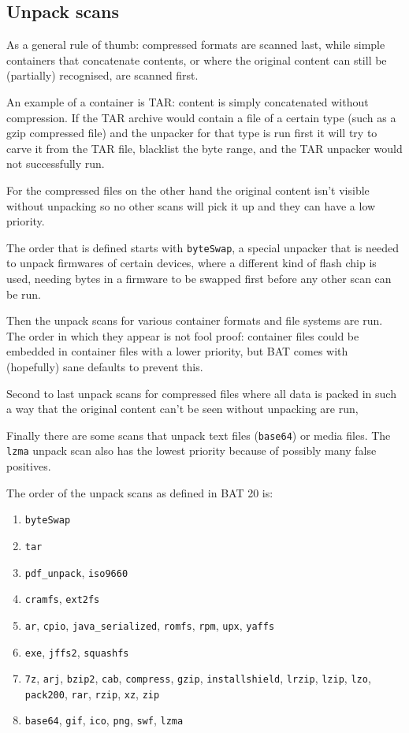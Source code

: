 \documentclass[10pt]{article}
\begin{document}
\subsection{Unpack scans}

As a general rule of thumb: compressed formats are scanned last, while
simple containers that concatenate contents, or where the original content can
still be (partially) recognised, are scanned first.

An example of a container is TAR: content is simply concatenated without
compression. If the TAR archive would contain a file of a certain type (such as
a gzip compressed file) and the unpacker for that type is run first it will try
to carve it from the TAR file, blacklist the byte range, and the TAR unpacker
would not successfully run.

For the compressed files on the other hand the original content isn't visible
without unpacking so no other scans will pick it up and they can have a low
priority.

The order that is defined starts with \texttt{byteSwap}, a special unpacker
that is needed to unpack firmwares of certain devices, where a different kind
of flash chip is used, needing bytes in a firmware to be swapped first before
any other scan can be run.

Then the unpack scans for various container formats and file systems are run.
The order in which they appear is not fool proof: container files could be
embedded in container files with a lower priority, but BAT comes with
(hopefully) sane defaults to prevent this.

Second to last unpack scans for compressed files where all data is packed in
such a way that the original content can't be seen without unpacking are run,

Finally there are some scans that unpack text files (\texttt{base64}) or media
files. The \texttt{lzma} unpack scan also has the lowest priority because of
possibly many false positives.

The order of the unpack scans as defined in BAT 20 is:

\begin{enumerate}
\item \texttt{byteSwap}
\item \texttt{tar}
\item \texttt{pdf\_unpack}, \texttt{iso9660}
\item \texttt{cramfs}, \texttt{ext2fs}
\item \texttt{ar}, \texttt{cpio}, \texttt{java\_serialized}, \texttt{romfs},
\texttt{rpm}, \texttt{upx}, \texttt{yaffs}
\item \texttt{exe}, \texttt{jffs2}, \texttt{squashfs}
\item \texttt{7z}, \texttt{arj}, \texttt{bzip2}, \texttt{cab},
\texttt{compress}, \texttt{gzip}, \texttt{installshield}, \texttt{lrzip},
\texttt{lzip}, \texttt{lzo}, \texttt{pack200}, \texttt{rar}, \texttt{rzip},
\texttt{xz}, \texttt{zip}
\item \texttt{base64}, \texttt{gif}, \texttt{ico}, \texttt{png}, \texttt{swf},
\texttt{lzma}
\end{enumerate}
\end{document}
